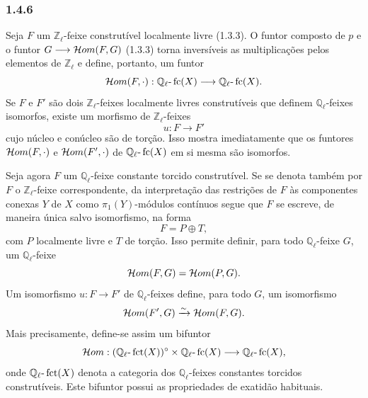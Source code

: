 \subsubsection*{1.4.6}
Seja \(F\) um \(\mathbb Z_\ell\)-feixe construtível localmente livre (1.3.3). O funtor composto de \(p\) e o funtor \(G\longrightarrow\mathcal{H}om(F,G)\) (1.3.3) torna inversíveis as multiplicações pelos elementos de \(\mathbb Z_\ell\) e define, portanto, um funtor
\[
\mathcal{H}om(F,\cdot):\mathbb Q_\ell\text{-}\operatorname{fc}(X)\longrightarrow \mathbb Q_\ell\text{-}\operatorname{fc}(X).
\]
Se \(F\) e \(F'\) são dois \(\mathbb Z_\ell\)-feixes localmente livres construtíveis que definem \(\mathbb Q_\ell\)-feixes isomorfos, existe um morfismo de \(\mathbb Z_\ell\)-feixes
\[
u:F\longrightarrow F'
\]
cujo núcleo e conúcleo são de torção. Isso mostra imediatamente que os funtores \(\mathcal{H}om(F,\cdot)\) e \(\mathcal{H}om(F',\cdot)\) de \(\mathbb Q_\ell\text{-}\operatorname{fc}(X)\) em si mesma são isomorfos.

Seja agora \(F\) um \(\mathbb Q_\ell\)-feixe constante torcido construtível. Se se denota também por \(F\) o \(\mathbb Z_\ell\)-feixe correspondente, da interpretação das restrições de \(F\) às componentes conexas \(Y\) de \(X\) como \(\pi_1(Y)\)-módulos contínuos segue que \(F\) se escreve, de maneira única salvo isomorfismo, na forma
\[
F=P\oplus T,
\]
com \(P\) localmente livre e \(T\) de torção. Isso permite definir, para todo \(\mathbb Q_\ell\)-feixe \(G\), um \(\mathbb Q_\ell\)-feixe
\[
\mathcal{H}om(F,G)=\mathcal{H}om(P,G).
\]
Um isomorfismo \(u:F\to F'\) de \(\mathbb Q_\ell\)-feixes define, para todo \(G\), um isomorfismo
\[
\mathcal{H}om(F',G)\xrightarrow{\sim}\mathcal{H}om(F,G).
\]
Mais precisamente, define-se assim um bifuntor
\[
\mathcal{H}om:(\mathbb Q_\ell\text{-}\operatorname{fct}(X))^\circ\times \mathbb Q_\ell\text{-}\operatorname{fc}(X)
\longrightarrow \mathbb Q_\ell\text{-}\operatorname{fc}(X),
\]
onde \(\mathbb Q_\ell\text{-}\operatorname{fct}(X)\) denota a categoria dos \(\mathbb Q_\ell\)-feixes constantes torcidos construtíveis. Este bifuntor possui as propriedades de exatidão habituais.

